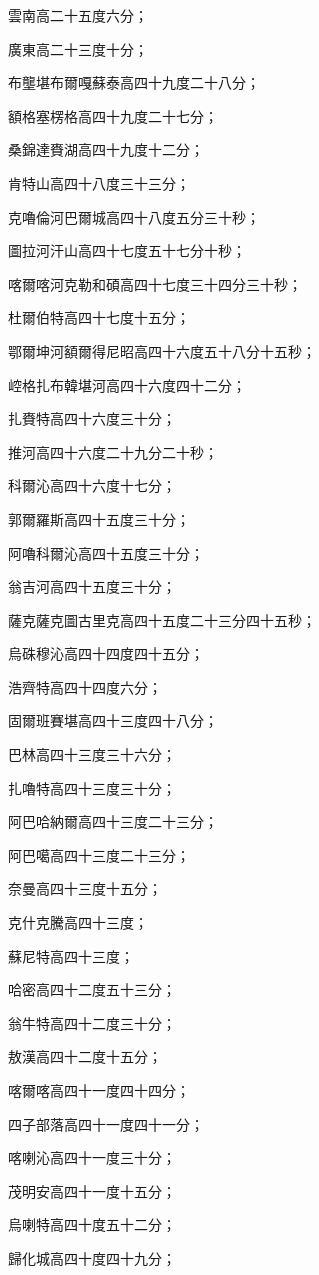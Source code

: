 \begin{pinyinscope}
雲南高二十五度六分；

廣東高二十三度十分；

布壟堪布爾嘎蘇泰高四十九度二十八分；

額格塞楞格高四十九度二十七分；

桑錦達賚湖高四十九度十二分；

肯特山高四十八度三十三分；

克嚕倫河巴爾城高四十八度五分三十秒；

圖拉河汗山高四十七度五十七分十秒；

喀爾喀河克勒和碩高四十七度三十四分三十秒；

杜爾伯特高四十七度十五分；

鄂爾坤河額爾得尼昭高四十六度五十八分十五秒；

崆格扎布韓堪河高四十六度四十二分；

扎賚特高四十六度三十分；

推河高四十六度二十九分二十秒；

科爾沁高四十六度十七分；

郭爾羅斯高四十五度三十分；

阿嚕科爾沁高四十五度三十分；

翁吉河高四十五度三十分；

薩克薩克圖古里克高四十五度二十三分四十五秒；

烏硃穆沁高四十四度四十五分；

浩齊特高四十四度六分；

固爾班賽堪高四十三度四十八分；

巴林高四十三度三十六分；

扎嚕特高四十三度三十分；

阿巴哈納爾高四十三度二十三分；

阿巴噶高四十三度二十三分；

奈曼高四十三度十五分；

克什克騰高四十三度；

蘇尼特高四十三度；

哈密高四十二度五十三分；

翁牛特高四十二度三十分；

敖漢高四十二度十五分；

喀爾喀高四十一度四十四分；

四子部落高四十一度四十一分；

喀喇沁高四十一度三十分；

茂明安高四十一度十五分；

烏喇特高四十度五十二分；

歸化城高四十度四十九分；


\end{pinyinscope}
